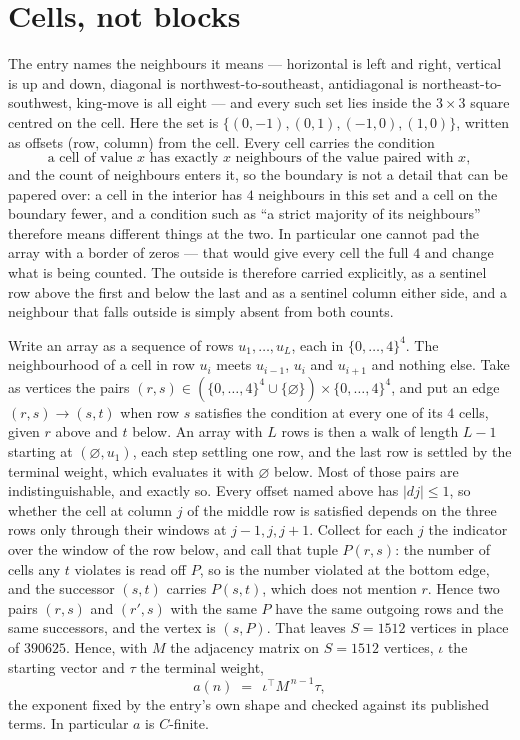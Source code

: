 \documentclass[11pt,a4paper]{article}
\theoremstyle{plain}
\theoremstyle{definition}
\begin{document}
\section{Cells, not blocks}

The entry names the neighbours it means --- horizontal is left and right, vertical is up and
down, diagonal is northwest-to-southeast, antidiagonal is northeast-to-southwest, king-move is
all eight --- and every such set lies inside the $3\times3$ square centred on the cell. Here
the set is $\{(0,-1), (0,1), (-1,0), (1,0)\}$, written as offsets (row, column) from the cell. Every cell carries
the condition
\[
\text{a cell of value }x\text{ has exactly }x\text{ neighbours of the value paired with }x,
\]
and the count of neighbours enters it, so the boundary is not a detail that can be papered
over: a cell in the interior has $4$ neighbours in this set and a cell on the boundary
fewer, and a condition such as ``a strict majority of its neighbours'' therefore means
different things at the two. In particular one cannot pad the array with a border of zeros ---
that would give every cell the full $4$ and change what is being counted. The outside is
therefore carried
explicitly, as a sentinel row above the first and below the last and as a sentinel column
either side, and a neighbour that falls outside is simply absent from both counts.

Write an array as a sequence of rows $u_1,\dots,u_L$, each in
$\{0,\dots,4\}^{4}$. The neighbourhood of a cell in row $u_i$ meets $u_{i-1}$,
$u_i$ and $u_{i+1}$ and nothing else. Take as vertices the pairs
$(r,s)\in(\{0,\dots,4\}^{4}\cup\{\varnothing\})\times\{0,\dots,4\}^{4}$,
and put an edge $(r,s)\to(s,t)$ when row $s$ satisfies the condition at every one of its
$4$ cells, given $r$ above and $t$ below. An array with $L$ rows is then a walk of length
$L-1$ starting at $(\varnothing,u_1)$, each step settling one row, and the last row is
settled by the terminal weight, which evaluates it with $\varnothing$ below. Most of those pairs are indistinguishable, and exactly so. Every offset named above has $|dj|\le 1$, so whether the cell at column $j$ of the middle row is satisfied depends on the three rows only through their windows at $j-1,j,j+1$. Collect for each $j$ the indicator over the window of the row below, and call that tuple $P(r,s)$: the number of cells any $t$ violates is read off $P$, so is the number violated at the bottom edge, and the successor $(s,t)$ carries $P(s,t)$, which does not mention $r$. Hence two pairs $(r,s)$ and $(r',s)$ with the same $P$ have the same outgoing rows and the same successors, and the vertex is $(s,P)$. That leaves $S=1512$ vertices in place of $390625$. Hence,
with $M$ the adjacency matrix on $S=1512$ vertices, $\iota$ the starting vector and $\tau$ the
terminal weight,
\[
a(n)\;=\;\,\iota^{\!\top}M^{\,n-1}\tau ,
\]
the exponent fixed by the entry's own shape and checked against its published terms. In
particular $a$ is $C$-finite.
\end{document}
